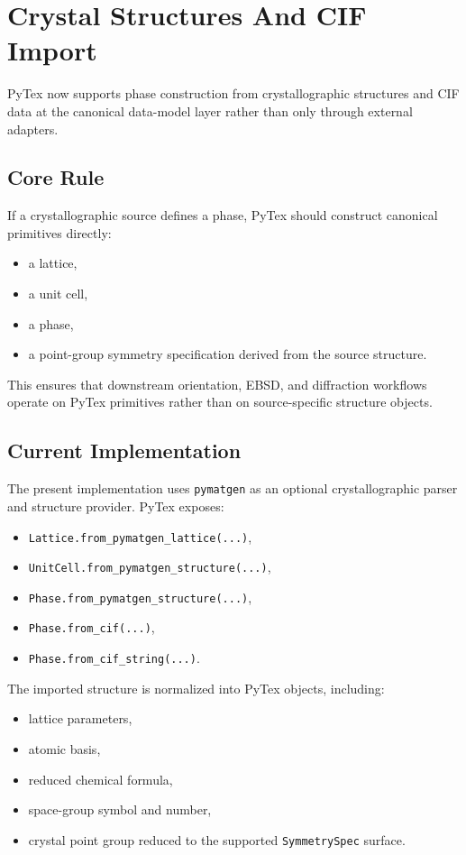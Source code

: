 \section{Crystal Structures And CIF Import}

PyTex now supports phase construction from crystallographic structures and CIF data at the canonical data-model layer rather than only through external adapters.

\subsection{Core Rule}

If a crystallographic source defines a phase, PyTex should construct canonical primitives directly:
\begin{itemize}
  \item a lattice,
  \item a unit cell,
  \item a phase,
  \item a point-group symmetry specification derived from the source structure.
\end{itemize}

This ensures that downstream orientation, EBSD, and diffraction workflows operate on PyTex primitives rather than on source-specific structure objects.

\subsection{Current Implementation}

The present implementation uses \texttt{pymatgen} as an optional crystallographic parser and structure provider. PyTex exposes:
\begin{itemize}
  \item \texttt{Lattice.from\_pymatgen\_lattice(...)},
  \item \texttt{UnitCell.from\_pymatgen\_structure(...)},
  \item \texttt{Phase.from\_pymatgen\_structure(...)},
  \item \texttt{Phase.from\_cif(...)},
  \item \texttt{Phase.from\_cif\_string(...)}.
\end{itemize}

The imported structure is normalized into PyTex objects, including:
\begin{itemize}
  \item lattice parameters,
  \item atomic basis,
  \item reduced chemical formula,
  \item space-group symbol and number,
  \item crystal point group reduced to the supported \texttt{SymmetrySpec} surface.
\end{itemize}

